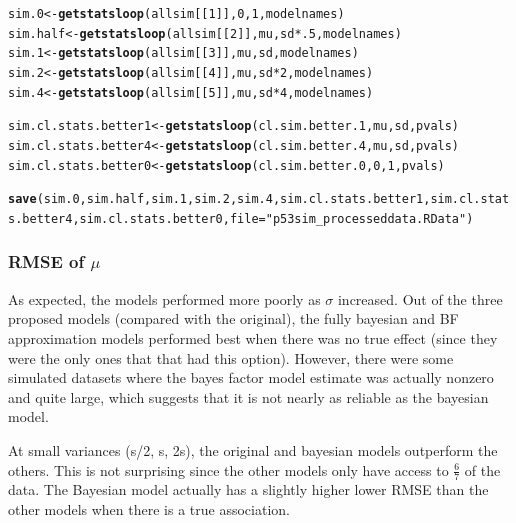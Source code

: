 \documentclass[AMA,STIX1COL]{WileyNJD-v2}\usepackage[]{graphicx}\usepackage[]{color}
\makeatletter
\newcommand{\hlnum}[1]{\textcolor[rgb]{0.686,0.059,0.569}{#1}}%
\newcommand{\hlstr}[1]{\textcolor[rgb]{0.192,0.494,0.8}{#1}}%
\newcommand{\hlopt}[1]{\textcolor[rgb]{0,0,0}{#1}}%
\newcommand{\hlstd}[1]{\textcolor[rgb]{0.345,0.345,0.345}{#1}}%
\newcommand{\hlkwb}[1]{\textcolor[rgb]{0.69,0.353,0.396}{#1}}%
\newcommand{\hlkwc}[1]{\textcolor[rgb]{0.333,0.667,0.333}{#1}}%
\newcommand{\hlkwd}[1]{\textcolor[rgb]{0.737,0.353,0.396}{\textbf{#1}}}%
\newenvironment{kframe}{%
 \def\at@end@of@kframe{}%
 \ifinner\ifhmode%
  \def\at@end@of@kframe{\end{minipage}}%
  \begin{minipage}{\columnwidth}%
 \fi\fi%
 \def\FrameCommand##1{\hskip\@totalleftmargin \hskip-\fboxsep
 \colorbox{shadecolor}{##1}\hskip-\fboxsep
     \hskip-\linewidth \hskip-\@totalleftmargin \hskip\columnwidth}%
 \MakeFramed {\advance\hsize-\width
   \@totalleftmargin\z@ \linewidth\hsize
   \@setminipage}}%
 {\par\unskip\endMakeFramed%
 \at@end@of@kframe}
\newenvironment{knitrout}{}{} %
\makeatother
\begin{document}
\begin{knitrout}
\color{fgcolor}\begin{kframe}
\begin{alltt}
\hlstd{sim.0}\hlkwb{<-}\hlkwd{getstatsloop}\hlstd{(allsim[[}\hlnum{1}\hlstd{]],}\hlnum{0}\hlstd{,} \hlnum{1}\hlstd{,modelnames)}
\hlstd{sim.half}\hlkwb{<-}\hlkwd{getstatsloop}\hlstd{(allsim[[}\hlnum{2}\hlstd{]],mu, sd}\hlopt{*}\hlnum{.5}\hlstd{,modelnames)}
\hlstd{sim.1}\hlkwb{<-}\hlkwd{getstatsloop}\hlstd{(allsim[[}\hlnum{3}\hlstd{]],mu, sd, modelnames)}
\hlstd{sim.2}\hlkwb{<-}\hlkwd{getstatsloop}\hlstd{(allsim[[}\hlnum{4}\hlstd{]],mu,sd}\hlopt{*}\hlnum{2}\hlstd{,modelnames)}
\hlstd{sim.4}\hlkwb{<-}\hlkwd{getstatsloop}\hlstd{(allsim[[}\hlnum{5}\hlstd{]],mu,sd}\hlopt{*}\hlnum{4}\hlstd{,modelnames)}

\hlstd{sim.cl.stats.better1}\hlkwb{<-}\hlkwd{getstatsloop}\hlstd{(cl.sim.better.1,mu,sd, pvals)}
\hlstd{sim.cl.stats.better4}\hlkwb{<-}\hlkwd{getstatsloop}\hlstd{(cl.sim.better.4,mu,sd, pvals)}
\hlstd{sim.cl.stats.better0}\hlkwb{<-}\hlkwd{getstatsloop}\hlstd{(cl.sim.better.0 ,}\hlnum{0}\hlstd{,}\hlnum{1}\hlstd{, pvals)}

\hlkwd{save}\hlstd{(sim.0, sim.half,sim.1,sim.2,sim.4, sim.cl.stats.better1,sim.cl.stats.better4,sim.cl.stats.better0,} \hlkwc{file} \hlstd{=} \hlstr{"p53sim_processeddata.RData"}\hlstd{)}
\end{alltt}
\end{kframe}
\end{knitrout}

\subsubsection{RMSE of $\mu$}

As expected, the models performed more poorly as $\sigma$ increased. Out of the three proposed models (compared with the original), the fully bayesian and BF approximation models performed best when there was no true effect (since they were the only ones that that had this option). However, there were some simulated datasets where the bayes factor model estimate was actually nonzero and quite large, which suggests that it is not nearly as reliable as the bayesian model.


At small variances (s/2, s,  2s), the original and bayesian models outperform the others. This is not surprising since the other models only have access to $\frac{6}{7}$ of the data. The Bayesian model actually has a slightly higher lower RMSE than the other models when there is a true association.
\end{document}
